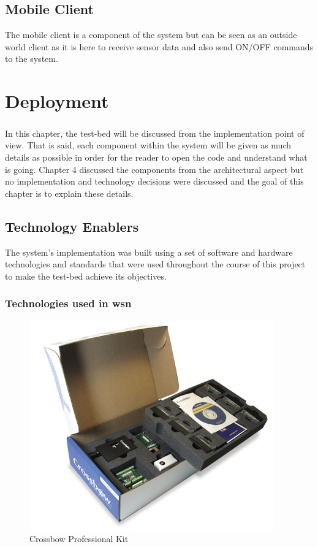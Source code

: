 \documentclass[oneside,12pt,a4paper,final]{book}
\begin{document}
\section{Mobile Client}
The mobile client is a component of the system but can be seen as an outside world client as it is here to receive sensor data and also send ON/OFF commands to the system.

\chapter{Deployment}
\paragraph{}
In this chapter, the test-bed will be discussed from the implementation point of view. That is said, each component within the system will be given as much details as possible in order for the reader to open the code and understand what is going. Chapter 4 discussed the components from the architectural aspect but no implementation and technology decisions were discussed and the goal of this chapter is to explain these details.
\section{Technology Enablers}
The system's implementation was built using a set of software and hardware technologies and standards that were used throughout the course of this project to make the test-bed achieve its objectives.
\subsection{Technologies used in \gls{wsn}}

\begin{figure}[htbp]
\centering
\includegraphics[scale=0.6]{img/crossbow.jpg}
\caption{Crossbow Professional Kit}
\label{fig:crossbow}
\end{figure}
\end{document}
